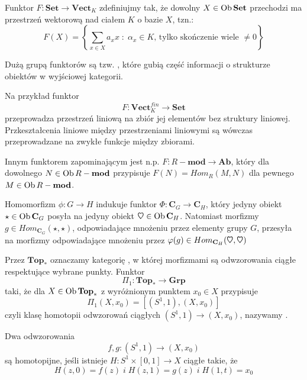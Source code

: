 \begin{example}
\item Funktor $F:\mathbf{Set}\to \mathbf{Vect}_K$ zdefiniujmy tak, że dowolny $X\in\operatorname{Ob}\mathbf{Set}$ przechodzi ma przestrzeń wektorową nad ciałem $K$ o bazie $X$, tzn.:
  $$F(X)=\left\{\sum_{x\in X} a_xx\;:\;\alpha_x\in K\text{, tylko skończenie wiele }\neq0\right\}$$

\item Dużą grupą funktorów są tzw. , które gubią część informacji o strukturze obiektów w wyjściowej kategorii. 

  Na przykład funktor
  $$F:\mathbf{Vect}_K^{fin}\to\mathbf{Set}$$
  przeprowadza przestrzeń liniową na zbiór jej elementów bez struktury liniowej. Przkeształcenia liniowe między przestrzeniami liniowymi są wówczas przeprowadzane na zwykłe funkcje między zbiorami.

  Innym funktorem zapominającym jest n.p. $F:R-\mathbf{mod}\to\mathbf{Ab}$, który dla dowolnego $N\in\operatorname{Ob} R-\mathbf{mod}$ przypisuje $F(N)=Hom_R(M, N)$ dla pewnego $M\in\operatorname{Ob} R-\mathbf{mod}$.

\item Homomorfizm $\phi:G\to H$ indukuje funktor $\Phi:\mathbf{C}_G\to \mathbf{C}_H$, który jedyny obiekt $\star\in\operatorname{Ob}\mathbf{C}_G$ posyła na jedyny obiekt $\text{\Heart}\in\ob\mathbf{C}_H$. Natomiast morfizmy $g\in Hom_{\mathbf{C}_G}(\star,\star)$, odpowiadające mnożeniu przez elementy grupy $G$, przesyła na morfizmy odpowiadające mnożeniu przez $\phi(g)\in Hom_{\mathbf{C}_H}(\text{\Heart}, \text{\Heart})$

\item Przez $\mathbf{Top}_*$ oznaczamy kategorię , w której morfizmami są odwzorowania ciągłe respektujące wybrane punkty. Funktor
  $$\Pi_1:\mathbf{Top}_*\to\mathbf{Grp}$$
taki, że dla $X\in\operatorname{Ob}\mathbf{Top}_*$ z wyróżnionym punktem $x_0\in X$ przypisuje 
$$\Pi_1(X, x_0)=[(S^1,1),(X, x_0)]$$
czyli klasę homotopii odwzorowań ciągłych $(S^1, 1)\to (X, x_0)$, nazywamy .

Dwa odwzorowania 
$$f,g:(S^1, 1)\to (X, x_0)$$
są homotopijne, jeśli istnieje $H:S^1\times [0,1]\to X$ ciągłe takie, że 
$$H(z, 0)=f(z)\; i\; H(z, 1)=g(z)\; i\; H(1, t)=x_0$$
\begin{center}
\end{center}
\end{example}
